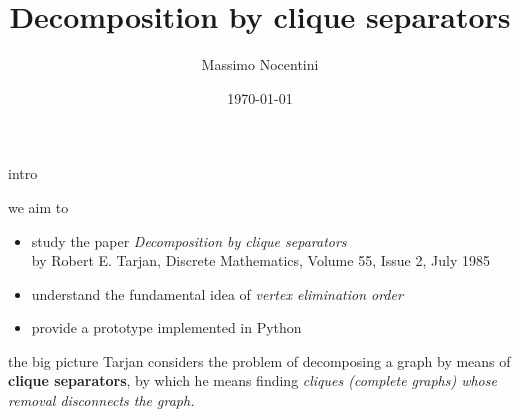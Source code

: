 \documentclass{beamer}
\title{Decomposition by clique separators}
\author[Merlini, Nocentini] %
{Massimo Nocentini}
\institute
{
  Dipartimento di Statistica, Informatica, Applicazioni \\
  University of Florence, Italy
}
\date[Short Occasion] %
{\today}
\begin{document}
\begin{frame}
  \titlepage
\end{frame}

\iffalse
\begin{frame}{Outline}
  \tableofcontents
\end{frame}
\fi





\begin{frame}{intro}

\begin{block}{we aim to}
\begin{itemize}
    \item study the paper \textit{Decomposition by clique
    separators}\\{\footnotesize by Robert E. Tarjan, Discrete Mathematics, Volume 55,
    Issue 2, July 1985}
    \item understand the fundamental idea of \textit{vertex elimination order}
    \item provide a prototype implemented in Python 
\end{itemize}
\end{block}

\begin{block}{the big picture}
Tarjan considers the problem of decomposing a graph by means of \textbf{clique
separators}, by which he means finding \textit{cliques (complete graphs) whose removal
disconnects the graph.} 
\end{block}

\end{frame}
\end{document}
